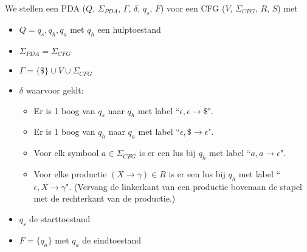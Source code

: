   We stellen een PDA ($Q$, $\Sigma_{PDA}$, $\Gamma$, $\delta$, $q_s$, $F$) voor een CFG ($V$, $\Sigma_{CFG}$, $R$, $S$) met
  \begin{itemize}
  \item $Q = {q_s, q_h, q_a}$ met $q_h$ een hulptoestand
  \item $\Sigma_{PDA} = \Sigma_{CFG}$
  \item $\Gamma = \{\$\} \cup V \cup \Sigma_{CFG}$
  \item $\delta$ waarvoor geldt:
  \begin{itemize}
  \item Er is 1 boog van $q_s$ naar $q_h$ met label ``$\epsilon,\epsilon\rightarrow\$$".
  \item Er is 1 boog van $q_h$ naar $q_a$ met label ``$\epsilon,\$\rightarrow\epsilon$".
  \item Voor elk symbool $a \in \Sigma_{CFG}$ is er een lus bij $q_h$ met label ``$a,a\rightarrow\epsilon$".
  \item Voor elke productie $(X \rightarrow \gamma) \in R$ is er een lus bij $q_h$ met label ``$\epsilon,X\rightarrow\gamma$". (Vervang de linkerkant van een productie bovenaan de stapel met de rechterkant van de productie.)
  \end{itemize}
  \item $q_s$ de starttoestand
  \item $F = \{q_a\}$ met $q_a$ de eindtoestand
  \end{itemize}